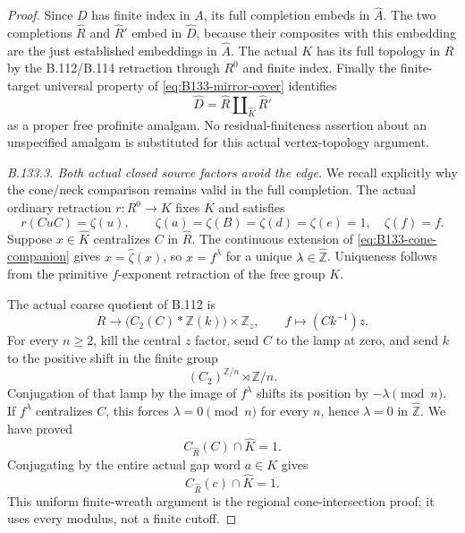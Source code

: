 \begin{proof}
Since $D$ has finite index in $A$, its full completion embeds
in $\widehat A$. The two completions $\widehat R$ and
$\widehat R'$ embed in $\widehat D$, because their composites
with this embedding are the just established embeddings in
$\widehat A$. The actual $K$ has its full topology in $R$ by
the B.112/B.114 retraction through $R^0$ and finite index.
Finally the finite-target universal property of
\eqref{eq:B133-mirror-cover} identifies
\begin{equation}\label{eq:B133-proper-completed-cover}
 \widehat D=\widehat R\amalg_{\widehat K}\widehat R'
\end{equation}
as a proper free profinite amalgam. No residual-finiteness
assertion about an unspecified amalgam is substituted for this
actual vertex-topology argument.

\emph{B.133.3. Both actual closed source factors avoid the edge.}
We recall explicitly why the cone/neck comparison remains valid
in the full completion. The actual ordinary retraction
$r:R^0\to K$ fixes $K$ and satisfies
\begin{equation}\label{eq:B133-cone-companion}
 r(CuC)=\zeta(u),\qquad
 \zeta(a)=\zeta(B)=\zeta(d)=\zeta(e)=1,
 \quad\zeta(f)=f.
\end{equation}
Suppose $x\in\widehat K$ centralizes $C$ in $\widehat R$.
The continuous extension of \eqref{eq:B133-cone-companion}
gives $x=\widehat\zeta(x)$, so $x=f^\lambda$ for a unique
$\lambda\in\widehat{\mathbb Z}$. Uniqueness follows from the
primitive $f$-exponent retraction of the free group $K$.

The actual coarse quotient of B.112 is
\[
 R\longrightarrow
   \bigl(C_2(C)*\mathbb Z(k)\bigr)\times\mathbb Z_z,
 \qquad f\longmapsto(Ck^{-1})z.
\]
For every $n\geq2$, kill the central $z$ factor, send $C$ to
the lamp at zero, and send $k$ to the positive shift in the finite group
\[
 (C_2)^{\mathbb Z/n}\rtimes\mathbb Z/n.
\]
Conjugation of that lamp by the image of $f^\lambda$ shifts its
position by $-\lambda\pmod n$. If $f^\lambda$ centralizes $C$,
this forces $\lambda=0\pmod n$ for every $n$, hence
$\lambda=0$ in $\widehat{\mathbb Z}$. We have proved
\[
 C_{\widehat R}(C)\cap\widehat K=1.
\]
Conjugating by the entire actual gap word $a\in K$ gives
\begin{equation}\label{eq:B133-compact-cone-avoidance}
 C_{\widehat R}(c)\cap\widehat K=1.
\end{equation}
This uniform finite-wreath argument is the regional
cone-intersection proof; it uses every modulus, not a finite cutoff.


\end{proof}
